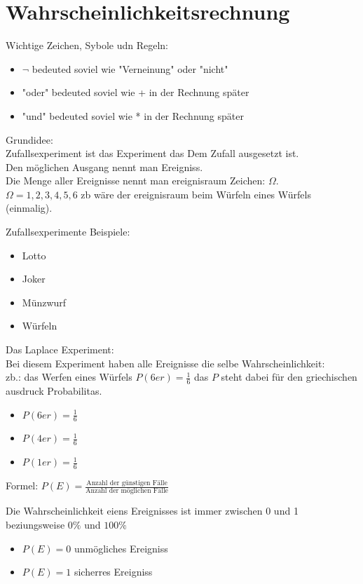\newpage
\section{Wahrscheinlichkeitsrechnung}

Wichtige Zeichen, Sybole udn Regeln:\\
\begin{itemize}
    \item $\lnot$ bedeuted soviel wie "Verneinung" oder "nicht"
    \item "oder" bedeuted soviel wie + in der Rechnung später
    \item "und" bedeuted soviel wie * in der Rechnung später
\end{itemize}


\hfill \break
Grundidee:\\
Zufallsexperiment ist das Experiment das Dem Zufall ausgesetzt ist.\\ 
Den möglichen Ausgang nennt man Ereigniss.\\
Die Menge aller Ereignisse nennt man ereignisraum Zeichen: $\Omega$.\\
$\Omega = {1,2,3,4,5,6}$ zb wäre der ereignisraum beim Würfeln eines Würfels (einmalig).

\hfill \break
Zufallsexperimente Beispiele:
\begin{itemize}
    \item Lotto
    \item Joker
    \item Münzwurf
    \item Würfeln
\end{itemize}

\hfill \break
Das Laplace Experiment:\\
Bei diesem Experiment haben alle Ereignisse die selbe Wahrscheinlichkeit:\\
zb.: das Werfen eines Würfels $P(6er) = \frac{1}{6}$ das $P$ steht dabei für den griechischen ausdruck Probabilitas.\\
\begin{itemize}
    \item $P(6er) = \frac{1}{6}$
    \item $P(4er) = \frac{1}{6}$
    \item $P(1er) = \frac{1}{6}$
\end{itemize}

\hfill \break
Formel: $P(E) = \frac{\textrm{Anzahl der günstigen Fälle}}{\textrm{Anzahl der möglichen Fälle}}$

\hfill \break
Die Wahrscheinlichkeit eiens Ereignisses ist immer zwischen 0 und 1 beziungsweise $0\%$ und $100\%$\\
\begin{itemize}
    \item $P(E)=0$ unmögliches Ereigniss
    \item $P(E)=1$ sicherres Ereigniss
\end{itemize}

\hfill \break

\hfill \break

\hfill \break

\hfill \break

